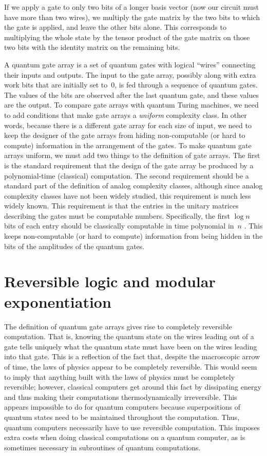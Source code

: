 If we apply a gate to only two bits of a longer basis vector (now
our circuit must have more than two wires), we multiply the
gate matrix by
the two bits to which the gate is applied, and leave the other bits alone.
This corresponds to multiplying the whole state by the tensor product
of the gate matrix on those two bits with the 
identity matrix on the remaining bits.

A quantum gate array is a set of quantum gates with 
logical ``wires'' connecting
their inputs and outputs.  The input to the 
gate array, possibly along with extra work bits that
are initially set to~0, is fed through a sequence of quantum gates.
The values of the bits are observed after the last quantum gate,
and these values are the output.  To compare
gate arrays with quantum Turing machines, we need to add conditions
that make gate arrays a {\em uniform} complexity class.  In other words,
because there is a different gate array for each size of input, we
need to keep the designer of the gate arrays from hiding non-computable
(or hard to compute) information in the arrangement of the gates.  
To make quantum gate arrays uniform, we must add two things to the
definition of gate arrays.  The first is the standard requirement that
the design of the gate array be produced by a polynomial-time (classical)
computation.  The second requirement 
should be a standard part of the definition of analog complexity classes, 
although since analog complexity classes have not
been widely studied, this requirement is much less widely known.
This requirement is that the entries in the unitary matrices describing
the gates must be computable numbers.  Specifically, the first $\log n$ 
bits of each entry should be classically computable in time polynomial in~$n$
\cite{Solo}.
This keeps non-computable (or hard to compute) information 
from being hidden in the bits of the amplitudes of the quantum gates.


\section{Reversible logic and modular exponentiation}
The definition of quantum gate arrays gives rise to completely reversible
computation.  That is, knowing the quantum state on the wires leading out
of a gate tells uniquely what the quantum state must have been on the
wires leading into that gate.  This is a reflection of the fact that,
despite the macroscopic arrow of time, the laws of physics appear to
be completely reversible.   This would seem to imply that anything built 
with the laws
of physics must be completely reversible; however, classical computers 
get around this fact by dissipating energy and thus making their 
computations thermodynamically irreversible.  This appears
impossible to do for quantum computers because superpositions of 
quantum states need to be maintained throughout the computation.  Thus, 
quantum computers necessarily have to use reversible computation.  
This imposes extra costs when doing classical computations on a quantum 
computer, as is sometimes necessary in subroutines of quantum
computations.

